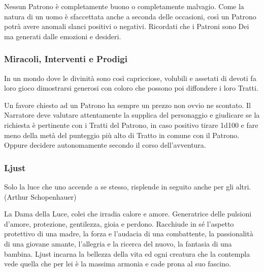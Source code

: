 \begin{multicols}{2}
\medskip

Nessun Patrono è completamente buono o completamente malvagio. Come la natura di un uomo è sfaccettata anche a seconda delle occasioni, così un Patrono potrà avere anomali slanci positivi o negativi. Ricordati che i Patroni sono Dei ma generati dalle emozioni e desideri.

\subsubsection{Miracoli, Interventi e Prodigi}

In un mondo dove le divinità sono così capricciose, volubili e assetati di devoti fa loro gioco dimostrarsi generosi con coloro che possono poi diffondere i loro Tratti.

Un favore chiesto ad un Patrono ha sempre un prezzo non ovvio ne scontato. Il Narratore deve valutare attentamente la supplica del personaggio e giudicare se la richiesta è pertinente con i Tratti del Patrono, in caso positivo tirare 1d100 e fare meno della metà del punteggio più alto di Tratto in comune con il Patrono. Oppure decidere autonomamente secondo il corso dell'avventura.



\subsubsection{Ljust}\label{ljust}\hypertarget{ljust}{}


\begin{changemargin}{0.3cm}{0.3cm}\begin{enfasi}{
Solo la luce che uno accende a se stesso, risplende in seguito anche per gli altri. (Arthur Schopenhauer)
}\end{enfasi}\end{changemargin}

La Dama della Luce, colei che irradia calore e amore. Generatrice delle pulsioni d'amore, protezione, gentilezza, gioia e perdono. Racchiude in sé l'aspetto protettivo di una madre, la forza e l'audacia di una combattente, la passionalità di una giovane amante, l'allegria e la ricerca del nuovo, la fantasia di una bambina. Ljust incarna la bellezza della vita ed ogni creatura che la contempla vede quella che per lei è la massima armonia e cade prona al suo fascino.


\end{multicols}
